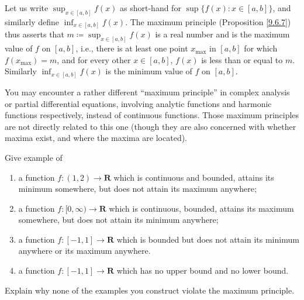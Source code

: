 \begin{note}
    Let us write \(\sup_{x \in [a, b]} f(x)\) as short-hand for \(\sup\{f(x) : x \in [a, b]\}\), and similarly define \(\inf_{x \in [a, b]} f(x)\).
    The maximum principle (Proposition \ref{9.6.7}) thus asserts that \(m \coloneqq \sup_{x \in [a, b]} f(x)\) is a real number and is the maximum value of \(f\) on \([a, b]\), i.e., there is at least one point \(x_{\max}\) in \([a, b]\) for which \(f(x_{\max}) = m\), and for every other \(x \in [a, b]\), \(f(x)\) is less than or equal to \(m\).
    Similarly \(\inf_{x \in [a, b]} f(x)\) is the minimum value of \(f\) on \([a, b]\).
\end{note}

\begin{remark}\label{9.6.9}
    You may encounter a rather different ``maximum principle'' in complex analysis or partial differential equations, involving analytic functions and harmonic functions respectively, instead of continuous functions.
    Those maximum principles are not directly related to this one
    (though they are also concerned with whether maxima exist, and where the maxima are located).
\end{remark}

\exercisesection

\begin{exercise}\label{ex 9.6.1}
    Give example of
    \begin{enumerate}
        \item a function \(f : (1, 2) \to \mathbf{R}\) which is continuous and bounded, attains its minimum somewhere, but does not attain its maximum anywhere;
        \item a function \(f : [0, \infty) \to \mathbf{R}\) which is continuous, bounded, attains its maximum somewhere, but does not attain its minimum anywhere;
        \item a function \(f : [-1, 1] \to \mathbf{R}\) which is bounded but does not attain its minimum anywhere or its maximum anywhere.
        \item a function \(f : [-1, 1] \to \mathbf{R}\) which has no upper bound and no lower bound.
    \end{enumerate}
    Explain why none of the examples you construct violate the maximum principle.
\end{exercise}

